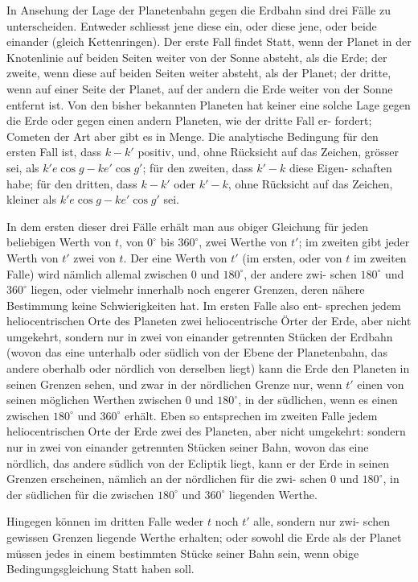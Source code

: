 \documentclass[12pt,a4paper]{article}
\begin{document}
In Ansehung der Lage der Planetenbahn gegen die Erdbahn sind drei Fälle
zu unterscheiden. Entweder schliesst jene diese ein, oder diese jene, oder beide
einander (gleich Kettenringen). Der erste Fall findet Statt, wenn der Planet
in der Knotenlinie auf beiden Seiten weiter von der Sonne absteht, als die Erde;
der zweite, wenn diese auf beiden Seiten weiter absteht, als der Planet; der
dritte, wenn auf einer Seite der Planet, auf der andern die Erde weiter von der
Sonne entfernt ist. Von den bisher bekannten Planeten hat keiner eine solche
Lage gegen die Erde oder gegen einen andern Planeten, wie der dritte Fall er-
fordert; Cometen der Art aber gibt es in Menge. Die analytische Bedingung für
den ersten Fall ist, dass $k - k'$ positiv, und, ohne Rücksicht auf das Zeichen,
grösser sei, als $k'e\cos g - ke'\cos g'$; für den zweiten, dass $k' - k$ diese Eigen-
schaften habe; für den dritten, dass $k - k'$ oder $k' - k$, ohne Rücksicht auf das
Zeichen, kleiner als $k'e\cos g - ke'\cos g'$ sei.

In dem ersten dieser drei Fälle erhält man aus obiger Gleichung für jeden
beliebigen Werth von $t$, von $0^{\circ}$ bis $360^{\circ}$, zwei Werthe von $t'$; im zweiten gibt
jeder Werth von $t'$ zwei von $t$. Der eine Werth von $t'$ (im ersten, oder von $t$
im zweiten Falle) wird nämlich allemal zwischen $0$ und $180^{\circ}$, der andere zwi-
schen $180^{\circ}$ und $360^{\circ}$ liegen, oder vielmehr innerhalb noch engerer Grenzen,
deren nähere Bestimmung keine Schwierigkeiten hat. Im ersten Falle also ent-
sprechen jedem heliocentrischen Orte des Planeten zwei heliocentrische Örter
der Erde, aber nicht umgekehrt, sondern nur in zwei von einander getrennten
Stücken der Erdbahn (wovon das eine unterhalb oder südlich von der Ebene der
Planetenbahn, das andere oberhalb oder nördlich von derselben liegt) kann die
Erde den Planeten in seinen Grenzen sehen, und zwar in der nördlichen Grenze
nur, wenn $t'$ einen von seinen möglichen Werthen zwischen $0$ und $180^{\circ}$, in der
südlichen, wenn es einen zwischen $180^{\circ}$ und $360^{\circ}$ erhält. Eben so entsprechen
im zweiten Falle jedem heliocentrischen Orte der Erde zwei des Planeten, aber
nicht umgekehrt: sondern nur in zwei von einander getrennten Stücken seiner
Bahn, wovon das eine nördlich, das andere südlich von der Ecliptik liegt, kann
er der Erde in seinen Grenzen erscheinen, nämlich an der nördlichen für die zwi-
schen $0$ und $180^{\circ}$, in der südlichen für die zwischen $180^{\circ}$ und $360^{\circ}$ liegenden
Werthe.

Hingegen können im dritten Falle weder $t$ noch $t'$ alle, sondern nur zwi-
schen gewissen Grenzen liegende Werthe erhalten; oder sowohl die Erde als der
Planet müssen jedes in einem bestimmten Stücke seiner Bahn sein, wenn obige
Bedingungsgleichung Statt haben soll.
\end{document}
